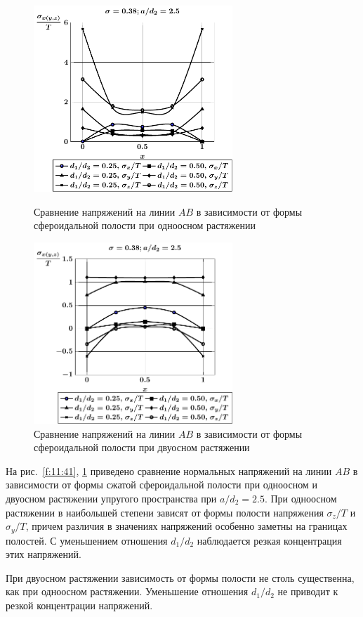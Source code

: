 \begin{figure}[h!]
\centering\footnotesize
\parbox[b]{7.5cm}{\centering\includegraphics[width=7.5cm]{periodic-oblate-cav27-d-a25-t1.pdf}
\caption{Сравнение напряжений на линии $AB$ в зависимости от формы сфероидальной полости при одноосном растяжении
\label{f:11:41}}}\hfil\hfil
\parbox[b]{7.5cm}{\centering\includegraphics[width=7.5cm]{periodic-oblate-cav27-d-a25-t2.pdf}
\caption{Сравнение напряжений на линии $AB$ в зависимости от формы сфероидальной полости при двуосном растяжении
\label{f:11:42}}}
\end{figure}

На рис.~\ref{f:11:41}, \ref{f:11:42} приведено сравнение нормальных напряжений на линии $AB$ в зависимости от формы сжатой сфероидальной полости при одноосном и двуосном растяжении упругого пространства при $a/d_2=2.5$. При одноосном растяжении в наибольшей степени зависят от формы полости напряжения $\sigma_z/T$ и $\sigma_y/T$, причем различия в значениях напряжений особенно заметны на границах полостей. С уменьшением отношения $d_1/d_2$ наблюдается резкая концентрация этих напряжений.

При двуосном растяжении зависимость от формы полости не столь существенна, как при одноосном растяжении. Уменьшение отношения $d_1/d_2$ не приводит к резкой концентрации напряжений.


